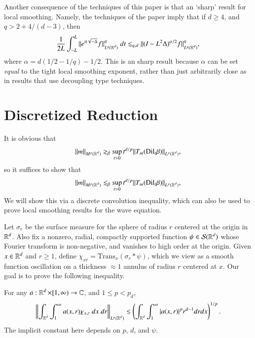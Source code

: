 Another consequence of the techniques of this paper is that an `sharp' result for local smoothing. Namely, the techniques of the paper imply that if $d \geq 4$, and $q > 2 + 4/(d-3)$, then
%
\[ \frac{1}{2L} \int_{-L}^L \| e^{it \sqrt{-\Delta}} f \|_{L^q(\operatorname{\mathbb{R}}^d)}^q\; dt \lesssim_{q,d} \| (I - L^2 \Delta)^{\alpha/2} f \|_{L^q(\operatorname{\mathbb{R}}^d)}^q, \]
%
where $\alpha = d(1/2 - 1/q) - 1/2$. This is an sharp result because $\alpha$ can be set \emph{equal} to the tight local smoothing exponent, rather than just arbitrarily close as in results that use decoupling type techniques.

\section{Discretized Reduction}

It is obvious that
%
\[ \| m \|_{M^p(\operatorname{\mathbb{R}}^d)} \gtrsim_\beta \sup_{t > 0} t^{d/p} \| T_m(\text{Dil}_t \beta) \|_{L^p(\operatorname{\mathbb{R}}^d)}, \]
%
so it suffices to show that
%
\[ \| m \|_{M^p(\operatorname{\mathbb{R}}^d)} \lesssim_\beta \sup_{t > 0} t^{d/p} \| T_m(\text{Dil}_t \beta) \|_{L^p(\operatorname{\mathbb{R}}^d)}, \]
%
We will show this via a discrete convolution inequality, which can also be used to prove local smoothing results for the wave equation.

Let $\sigma_r$ be the surface measure for the sphere of radius $r$ centered at the origin in $\operatorname{\mathbb{R}}^d$. Also fix a nonzero, radial, compactly supported function $\psi \in \mathcal{S}(\operatorname{\mathbb{R}}^d)$ whose Fourier transform is non-negative, and vanishes to high order at the origin. Given $x \in \operatorname{\mathbb{R}}^d$ and $r \geq 1$, define $\chi_{x r} = \text{Trans}_x (\sigma_r * \psi)$, which we view as a smooth function oscillation on a thickness $\approx 1$ annulus of radius $r$ centered at $x$. Our goal is to prove the following inequality.

\begin{lemma} \label{lemma1}
    For any $a : \operatorname{\mathbb{R}}^d \times [1,\infty) \to \operatorname{\mathbb{C}}$, and $1 \leq p < p_d$,
    \[ \left\| \int_{\operatorname{\mathbb{R}}^d} \int_1^\infty a(x,r) \chi_{x, r}\; dx\; dr \right\|_{L^p(\operatorname{\mathbb{R}}^d)} \lesssim \left( \int_{\operatorname{\mathbb{R}}^d} \int_1^\infty |a(x,r)|^p r^{d-1} dr dx \right)^{1/p}. \]
    The implicit constant here depends on $p$, $d$, and $\psi$.
\end{lemma}

